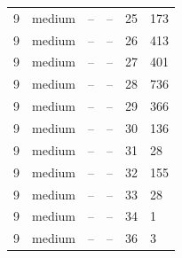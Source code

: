 \begin{tabular}{llllll}
9 & medium & -- & -- & 25 & 173 \\
9 & medium & -- & -- & 26 & 413 \\
9 & medium & -- & -- & 27 & 401 \\
9 & medium & -- & -- & 28 & 736 \\
9 & medium & -- & -- & 29 & 366 \\
9 & medium & -- & -- & 30 & 136 \\
9 & medium & -- & -- & 31 & 28 \\
9 & medium & -- & -- & 32 & 155 \\
9 & medium & -- & -- & 33 & 28 \\
9 & medium & -- & -- & 34 & 1 \\
9 & medium & -- & -- & 36 & 3 \\
\hline
\end{tabular}
